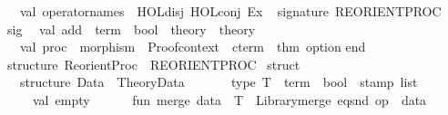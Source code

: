 \begin{isabellebody}
\ \ val\ operator{\isacharunderscore}{\kern0pt}names\ {\isacharequal}{\kern0pt}\ {\isacharbrackleft}{\kern0pt}\isactrlconstUNDERSCOREname {\isasymopen}HOL{\isachardot}{\kern0pt}disj{\isasymclose}{\isacharcomma}{\kern0pt}\ \isactrlconstUNDERSCOREname {\isasymopen}HOL{\isachardot}{\kern0pt}conj{\isasymclose}{\isacharcomma}{\kern0pt}\ \isactrlconstUNDERSCOREname {\isasymopen}Ex{\isasymclose}{\isacharbrackright}{\kern0pt}{\isacharsemicolon}{\kern0pt}\isanewline
{\isacharparenright}{\kern0pt}{\isacharsemicolon}{\kern0pt}\isanewline
{\isacartoucheclose}%
\endisatagML
{\isafoldML}%
%
\isadelimML
%
\endisadelimML
%
\isadelimdocument
%
\endisadelimdocument
%
\isatagdocument
%
\isamarkuptrue%
%
\endisatagdocument
{\isafolddocument}%
%
\isadelimdocument
%
\endisadelimdocument
%
\isadelimML
%
\endisadelimML
%
\isatagML
{}\isamarkupfalse%
\ {\isacartoucheopen}\isanewline
signature\ REORIENT{\isacharunderscore}{\kern0pt}PROC\ {\isacharequal}{\kern0pt}\isanewline
sig\isanewline
\ \ val\ add\ {\isacharcolon}{\kern0pt}\ {\isacharparenleft}{\kern0pt}term\ {\isacharminus}{\kern0pt}{\isachargreater}{\kern0pt}\ bool{\isacharparenright}{\kern0pt}\ {\isacharminus}{\kern0pt}{\isachargreater}{\kern0pt}\ theory\ {\isacharminus}{\kern0pt}{\isachargreater}{\kern0pt}\ theory\isanewline
\ \ val\ proc\ {\isacharcolon}{\kern0pt}\ morphism\ {\isacharminus}{\kern0pt}{\isachargreater}{\kern0pt}\ Proof{\isachardot}{\kern0pt}context\ {\isacharminus}{\kern0pt}{\isachargreater}{\kern0pt}\ cterm\ {\isacharminus}{\kern0pt}{\isachargreater}{\kern0pt}\ thm\ option\isanewline
end{\isacharsemicolon}{\kern0pt}\isanewline
\isanewline
structure\ Reorient{\isacharunderscore}{\kern0pt}Proc\ {\isacharcolon}{\kern0pt}\ REORIENT{\isacharunderscore}{\kern0pt}PROC\ {\isacharequal}{\kern0pt}\isanewline
struct\isanewline
\ \ structure\ Data\ {\isacharequal}{\kern0pt}\ Theory{\isacharunderscore}{\kern0pt}Data\isanewline
\ \ {\isacharparenleft}{\kern0pt}\isanewline
\ \ \ \ type\ T\ {\isacharequal}{\kern0pt}\ {\isacharparenleft}{\kern0pt}{\isacharparenleft}{\kern0pt}term\ {\isacharminus}{\kern0pt}{\isachargreater}{\kern0pt}\ bool{\isacharparenright}{\kern0pt}\ {\isacharasterisk}{\kern0pt}\ stamp{\isacharparenright}{\kern0pt}\ list{\isacharsemicolon}{\kern0pt}\isanewline
\ \ \ \ val\ empty\ {\isacharequal}{\kern0pt}\ {\isacharbrackleft}{\kern0pt}{\isacharbrackright}{\kern0pt}{\isacharsemicolon}{\kern0pt}\isanewline
\ \ \ \ fun\ merge\ data\ {\isacharcolon}{\kern0pt}\ T\ {\isacharequal}{\kern0pt}\ Library{\isachardot}{\kern0pt}merge\ {\isacharparenleft}{\kern0pt}eq{\isacharunderscore}{\kern0pt}snd\ {\isacharparenleft}{\kern0pt}op\ {\isacharequal}{\kern0pt}{\isacharparenright}{\kern0pt}{\isacharparenright}{\kern0pt}\ data{\isacharsemicolon}{\kern0pt}\isanewline

\end{isabellebody}
